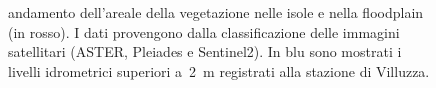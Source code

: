\documentclass[12pt,a4paper]{article}
\begin{document}
\begin{figure}[ht]
	\centering
	
	\caption[andamento dell'areale della vegetazione nelle isole  e nella floodplain]{andamento dell'areale della vegetazione nelle isole e nella floodplain (in rosso). I dati provengono dalla classificazione delle immagini satellitari (ASTER, Pleiades e Sentinel2). In blu sono mostrati i livelli idrometrici superiori a~\SI{2}{\m} registrati alla stazione di Villuzza.}
	\label{graph:class-sat-veg}
\end{figure}


\clearpage



\printbibliography
\end{document}
